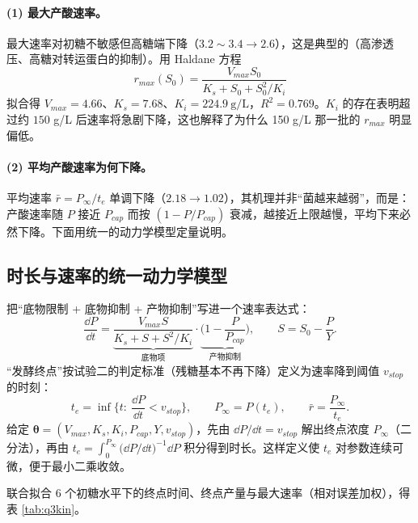 \paragraph{(1) 最大产酸速率。}最大速率对初糖不敏感但高糖端下降（$3.2\sim3.4\to2.6$），这是典型的（高渗透压、高糖对转运蛋白的抑制）。用 Haldane 方程
\begin{equation}
r_{max}(S_0)=\frac{V_{max}S_0}{K_s+S_0+S_0^2/K_i}
\label{eq:haldane}
\end{equation}
拟合得 $V_{max}=4.66$、$K_s=7.68$、$K_i=224.9\ \mathrm{g/L}$，$R^2=0.769$。$K_i$ 的存在表明超过约 $150$ g/L 后速率将急剧下降，这也解释了为什么 150 g/L 那一批的 $r_{max}$ 明显偏低。

\paragraph{(2) 平均产酸速率为何下降。}平均速率 $\bar r=P_\infty/t_e$ 单调下降（$2.18\to1.02$），其机理并非“菌越来越弱”，而是：产酸速率随 $P$ 接近 $P_{cap}$ 而按 $(1-P/P_{cap})$ 衰减，越接近上限越慢，平均下来必然下降。下面用统一的动力学模型定量说明。

\subsection{时长与速率的统一动力学模型}
把“底物限制 + 底物抑制 + 产物抑制”写进一个速率表达式：
\begin{equation}
\frac{\dd P}{\dd t}=\underbrace{\frac{V_{max}S}{K_s+S+S^2/K_i}}_{\text{底物项}}\cdot\underbrace{\Big(1-\frac{P}{P_{cap}}\Big)}_{\text{产物抑制}},\qquad S=S_0-\frac{P}{Y}.
\label{eq:q3ode}
\end{equation}
“发酵终点”按试验二的判定标准（残糖基本不再下降）定义为速率降到阈值 $v_{stop}$ 的时刻：
\begin{equation}
t_e=\inf\Big\{t:\ \frac{\dd P}{\dd t}<v_{stop}\Big\},\qquad P_\infty=P(t_e),\qquad \bar r=\frac{P_\infty}{t_e}.
\label{eq:te}
\end{equation}
给定 $\boldsymbol\theta=(V_{max},K_s,K_i,P_{cap},Y,v_{stop})$，先由 $\dd P/\dd t=v_{stop}$ 解出终点浓度 $P_\infty$（二分法），再由 $t_e=\int_0^{P_\infty}\big(\dd P/\dd t\big)^{-1}\dd P$ 积分得到时长。这样定义使 $t_e$ 对参数连续可微，便于最小二乘收敛。

联合拟合 6 个初糖水平下的终点时间、终点产量与最大速率（相对误差加权），得表 \ref{tab:q3kin}。

